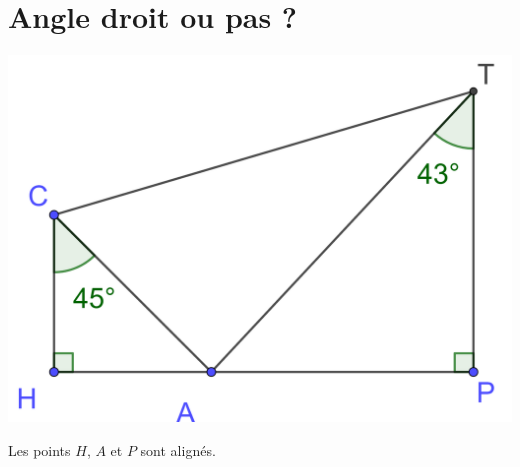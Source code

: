 \section{Angle droit ou pas ? }

	\begin{center}
		\includegraphics[scale=0.15]{img/fig}
	\end{center}
	
	Les points $H$, $A$  et $P$ sont alignés.
	
